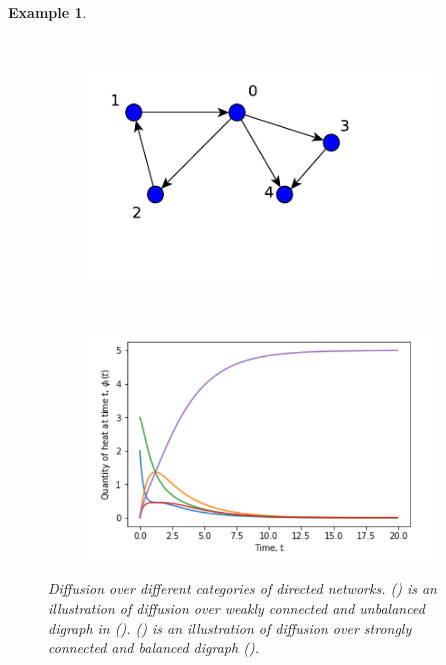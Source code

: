 \documentclass[10pt,a4paper]{article}
\newtheorem{exa}{Example}
\begin{document}
\begin{exa}
\begin{figure}[H]
\begin{subfigure}[b]{0.5\textwidth}
      	    	\caption{}
      	    	\label{plot-balanced}
      	    \end{subfigure} \\
            \begin{subfigure}[b]{0.40\textwidth}
            	\includegraphics[width=\textwidth]{images/UnbalanceDigraph.pdf}
            	\caption{}
            	\label{unbalanced-graph}
            \end{subfigure}~
            \begin{subfigure}[b]{0.5\textwidth}
            	\includegraphics[width= \textwidth]{images/non-balnceddigraph-difusion.png}
            	\caption{}
            	\label{plot-unbalanced}
            \end{subfigure}
      		\caption{Diffusion over different categories of directed networks. () is an illustration of diffusion over weakly connected and unbalanced digraph in (). () is an illustration of diffusion over strongly connected and balanced digraph ().  }  

\end{figure}
\end{exa}
\end{document}
